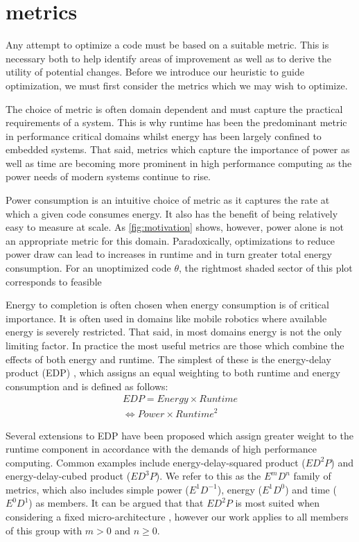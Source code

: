 \section{metrics}

Any attempt to optimize a code must be based on a suitable metric.
This is necessary both to help identify areas of improvement as well as to derive the utility of potential changes.
Before we introduce our heuristic to guide optimization, we must first consider the metrics which we may wish to optimize. 

The choice of metric is often domain dependent and must capture the practical requirements of a system.
This is why runtime has been the predominant metric in performance critical domains whilst energy has been largely confined to embedded systems.
That said, metrics which capture the importance of power as well as time are becoming more prominent in high performance computing as the power needs of modern systems continue to rise.

Power consumption is an intuitive choice of metric as it captures the rate at which a given code consumes energy. It also has the benefit of being relatively easy to measure at scale. As \autoref{fig:motivation} shows, however, power alone is not an appropriate metric for this domain. Paradoxically, optimizations to reduce power draw can lead to increases in runtime and in turn greater total energy consumption. For an unoptimized code $\theta$, the rightmost shaded sector of this plot corresponds to feasible  

Energy to completion is often chosen when energy consumption is of critical importance. It is often used in domains like mobile robotics where available energy is severely restricted. That said, in most domains energy is not the only limiting factor. In practice the most useful metrics are those which combine the effects of both energy and runtime. The simplest of these is the energy-delay product (EDP) \cite{gonzales:1995aa}, which assigns an equal weighting to both runtime and energy consumption and is defined as follows:
\begin{align}
  EDP = Energy \times Runtime \nonumber \\
      \Leftrightarrow Power \times Runtime^{2} 
  \label{eq:edp}
\end{align}

Several extensions to EDP have been proposed which assign greater weight to the runtime component in accordance with the demands of high performance computing. Common examples include energy-delay-squared product ($ED^{2}P$) and energy-delay-cubed product ($ED^{3}P$). We refer to this as the $E^mD^n$ family of metrics, which also includes simple power ($E^1D^{-1}$), energy ($E^1D^0$) and time ($E^0D^1$) as members. It can be argued that that $ED^{2}P$ is most suited when considering a fixed micro-architecture \cite{brooks:2000aa}, however our work applies to all members of this group with $m > 0$ and $n \geq 0$.
